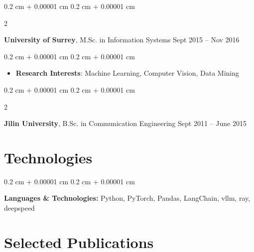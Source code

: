 \documentclass[10pt, letterpaper]{article}
\newenvironment{highlights}{
    \begin{itemize}[
        topsep=0.10 cm,
        parsep=0.10 cm,
        partopsep=0pt,
        itemsep=0pt,
        leftmargin=0.4 cm + 10pt
    ]
}{
    \end{itemize}
} %
\newenvironment{onecolentry}{
    \begin{adjustwidth}{
        0.2 cm + 0.00001 cm
    }{
        0.2 cm + 0.00001 cm
    }
}{
    \end{adjustwidth}
} %
\newenvironment{twocolentry}[2][]{
    \onecolentry
    \def\secondColumn{#2}
    \setcolumnwidth{\fill, 4.5 cm}
    \begin{paracol}{2}
}{
    \switchcolumn \raggedleft \secondColumn
    \end{paracol}
    \endonecolentry
} %
\begin{document}
        \vspace{0.2 cm}

        \begin{twocolentry}{
            Sept 2015 – Nov 2016
        }
            \textbf{University of Surrey}, M.Sc. in Information Systems\end{twocolentry}

        \vspace{0.10 cm}
        \begin{onecolentry}
            \begin{highlights}
                \item \textbf{Research Interests}: Machine Learning, Computer Vision, Data Mining
            \end{highlights}
        \end{onecolentry}


        \vspace{0.2 cm}

        \begin{twocolentry}{
            Sept 2011 – June 2015
        }
            \textbf{Jilin University}, B.Sc. in Communication Engineering\end{twocolentry}




    
    \section{Technologies}



        
        \begin{onecolentry}
            \textbf{Languages \& Technologies:} Python, PyTorch, Pandas, LangChain, vllm, ray, deepspeed
        \end{onecolentry}


    
    \section{Selected Publications}
\end{document}
